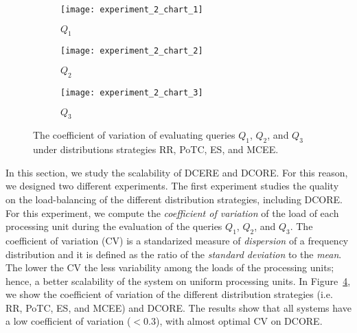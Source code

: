 \begin{figure}[t]
     \begin{adjustbox}{max width=1.5\linewidth,center}
     \centering
     \begin{subfigure}[b]{0.45\textwidth}
         \centering
         \texttt{[image: experiment\_2\_chart\_1]}
         \caption{$Q_{1}$}
         \label{fig:experiment:2:subfigure:1}
     \end{subfigure}
     \begin{subfigure}[b]{0.45\textwidth}
         \centering
         \texttt{[image: experiment\_2\_chart\_2]}
         \caption{$Q_{2}$}
         \label{fig:experiment:2:subfigure:2}
     \end{subfigure}
     \begin{subfigure}[b]{0.45\textwidth}
         \centering
         \texttt{[image: experiment\_2\_chart\_3]}
         \caption{$Q_{3}$}
         \label{fig:experiment:2:subfigure:3}
     \end{subfigure}
     \end{adjustbox}
     \caption{The coefficient of variation of evaluating queries $Q_{1}$, $Q_{2}$, and $Q_{3}$ under distributions strategies RR, PoTC, ES, and MCEE.}
     \label{fig:experiment:2}
\end{figure}

In this section, we study the scalability of DCERE and DCORE. For this reason, we designed two different experiments. The first experiment studies the quality on the load-balancing of the different distribution strategies, including DCORE. For this experiment, we compute the \emph{coefficient of variation} of the load of each processing unit during the evaluation of the queries $Q_{1}$, $Q_{2}$, and $Q_{3}$. The coefficient of variation (CV) is a standarized measure of \emph{dispersion} of a frequency distribution and it is defined as the ratio of the \emph{standard deviation} to the \emph{mean}. The lower the CV the less variability among the loads of the processing units; hence, a better scalability of the system on uniform processing units. In Figure~\ref{fig:experiment:2}, we show the coefficient of variation of the different distribution strategies (i.e. RR, PoTC, ES, and MCEE) and DCORE. The results show that all systems have a low coefficient of variation ($< 0.3$), with almost optimal CV on DCORE.


